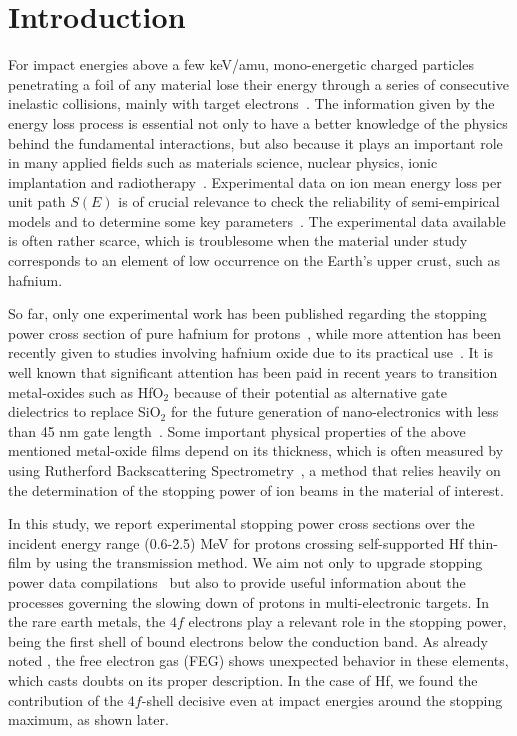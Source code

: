 \documentclass[aps,pra,reprint,superscriptaddress]{revtex4-1}
\def\ale#1{\textcolor{blue}{#1}}
\begin{document}
\linenumbers
\section{Introduction}
\label{intro}

For impact energies above a few keV/amu, mono-energetic charged 
particles penetrating a foil of any material lose their energy through 
a series of consecutive inelastic collisions, mainly with target 
electrons~\cite{Chu01,Sigmund}. The information given by the energy 
loss process is essential not only to have a better knowledge of the 
physics behind the fundamental interactions, but also because it plays 
an important role in many applied fields such as materials science, 
nuclear physics, ionic implantation and radiotherapy~\cite{Sigmund,Schardt}. 
Experimental data on ion mean energy loss per unit path $S(E)$ is of 
crucial relevance to check the reliability of semi-empirical models and 
to determine some key parameters~\cite{Diwan,Damache04,Damache02}. The 
experimental data available is often rather scarce, which is troublesome 
when the material under study corresponds to an element of low 
occurrence on the Earth's upper crust, such as hafnium.

So far, only one experimental work has been published regarding the 
stopping power cross section of pure hafnium for protons~\cite{Sirotinin}, 
while more attention has been recently given to  studies involving 
hafnium oxide due to its practical use~\ale{\cite{Abril,Behar,Primetzhofer,Roth}}. 
It is well known that significant attention has been paid in recent 
years to transition metal-oxides such as HfO$_2$ because of their 
potential as alternative gate dielectrics to replace SiO$_2$ for the 
future generation of nano-electronics with less than 45 nm gate 
length~\cite{Choi,Robertson}. Some important physical properties of the 
above mentioned metal-oxide films depend on its thickness, which is 
often measured by using Rutherford Backscattering Spectrometry~\cite{Alfassi01,Tesmer01}, 
a method that relies heavily on the determination of the stopping power 
of ion beams in the material of interest.

In this study, we report experimental stopping power cross sections 
over the incident energy range (0.6-2.5) MeV for protons crossing 
self-supported Hf thin-film by using the transmission method. We aim 
not only to upgrade stopping power data compilations~\cite{HPaul03,mondim17} 
but also to provide useful information about the processes governing 
the slowing down of protons in multi-electronic targets. In the rare 
earth metals, the $4f$ electrons play a relevant role in the stopping 
power, being the first shell of bound electrons below the conduction 
band. As already noted \cite{Roth17}, the free electron gas (FEG) shows 
unexpected behavior in these elements, which casts doubts on its proper 
description. In the case of Hf, we found the contribution of the 
$4f$-shell decisive even at impact energies around the stopping maximum, 
as shown later.
\end{document}
